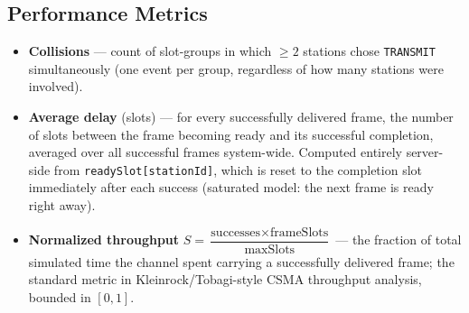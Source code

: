\documentclass[11pt]{article}
\begin{document}
\subsection{Performance Metrics}
\begin{itemize}[leftmargin=1.6em]
  \item \textbf{Collisions} --- count of slot-groups in which $\ge 2$ stations chose
  \texttt{TRANSMIT} simultaneously (one event per group, regardless of how many stations
  were involved).
  \item \textbf{Average delay} (slots) --- for every successfully delivered frame, the
  number of slots between the frame becoming ready and its successful completion, averaged
  over all successful frames system-wide. Computed entirely server-side from
  \texttt{readySlot[stationId]}, which is reset to the completion slot immediately after
  each success (saturated model: the next frame is ready right away).
  \item \textbf{Normalized throughput} $S = \dfrac{\text{successes} \times
  \text{frameSlots}}{\text{maxSlots}}$ --- the fraction of total simulated time the channel
  spent carrying a successfully delivered frame; the standard metric in Kleinrock/Tobagi-style
  CSMA throughput analysis, bounded in $[0,1]$.
\end{itemize}
\end{document}

